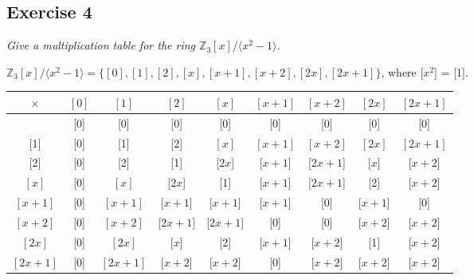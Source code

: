 \subsection*{Exercise 4}
\textit{Give a multiplication table for the ring $\mathbb{Z}_3[x]/\langle x^2 - 1 \rangle$.}

\vspace{5 mm}
$\mathbb{Z}_3[x]/\langle x^2 - 1 \rangle = \{[0],[1],[2],[x],[x+1],[x+2],[2x],[2x+1]\}$, where [$x^2$] = [1].

\begin{tabular}{| c | c c c c c c c c |}
\hline
${\times}$ & ${[0]}$ & ${[1]}$ & ${[2]}$ & ${[x]}$ & ${[x+1]}$ & $[x+2]$ & $[2x]$ & $[2x+1]$ \\ 
\hline
[0] & [0] & [0] & [0] & [0] & [0] & [0] & [0] & [0] \\

[1] & [0] & [1] & [2] & $[x]$ & $[x+1]$ & $[x+2]$ & $[2x]$ & $[2x+1]$ \\

[2] & [0] & [2] & [1] & [$2x$] & [$x+1$] & [$2x+1$] & [$x$] & [$x+2$] \\

$[x]$ & [0] & $[x]$ & [$2x$] & [1] & [$x+1$] & [$2x+1$] & [2] & [$x+2$] \\

$[x+1]$ & [0] & $[x+1]$ & [$x+1$] & [$x+1$] & [$x+1$] & [0] & [$x+1$] & [0] \\

$[x+2]$ & [0] & $[x+2]$ & [$2x+1$] & [$2x+1$] & [0] & [0] & [$x+2$] & [$x+2$] \\

$[2x]$ & [0] & $[2x]$ & [$x$] & [2] & [$x+1$] & [$x+2$] & [1] & [$x+2$] \\

$[2x+1]$ & [0] & $[2x+1]$ & [$x+2$] & [$x+2$] & [0] & [$x+2$] & [$x+2$] & [$x+2$] \\ \hline
\end{tabular}